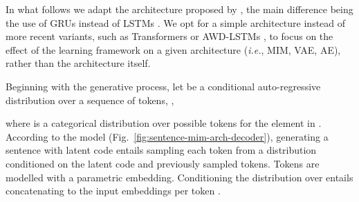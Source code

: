 \documentclass{article}
\newcommand{\ie}{{\em i.e.}}
\begin{document}
In what follows we adapt the architecture proposed by \citet{DBLP:journals/corr/BowmanVVDJB15}, 
the main difference being the use of GRUs \citep{cho-etal-2014-learning} instead of LSTMs \citep{Hochreiter:1997:LSM:1246443.1246450}.
We opt for a simple architecture instead of more recent variants, such as Transformers \citep{Vaswani2017}
or AWD-LSTMs \citep{merity2018regularizing}, to focus on the effect of the learning framework on a given architecture (\ie, MIM, VAE, AE), 
rather than the architecture itself.

Beginning with the generative process, let  be a conditional auto-regressive distribution 
over a sequence of  tokens, ,

where  is a categorical distribution over 
possible tokens for the  element in .
According to the model (Fig.\ \ref{fig:sentence-mim-arch-decoder}), generating
a sentence  with latent code  entails sampling each token from a
distribution conditioned on the latent code and previously sampled tokens.
Tokens are modelled with a parametric embedding. Conditioning the distribution over 
entails concatenating  to the input embeddings per token \citep{DBLP:journals/corr/BowmanVVDJB15}.
\end{document}
